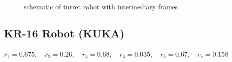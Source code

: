 \documentclass[11pt, oneside]{article}   	%
\begin{document}
\begin{figure}[H]
\begin{floatrow}
{}{%
  \caption{schematic of turret robot with intermediary frames}%
}
\end{floatrow}
\end{figure}

\pagebreak

\subsection{KR-16 Robot (KUKA)}

$r_1 = 0.675, \quad r_2 = 0.26, \quad r_3 = 0.68, \quad r_4 = 0.035, \quad r_5 = 0.67, \quad r_e = 0.158$
\end{document}
